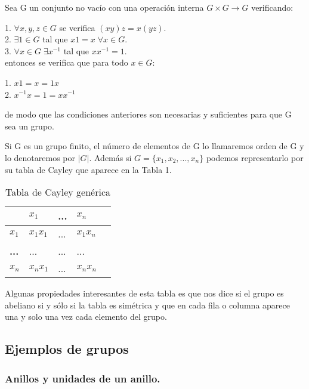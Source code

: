 \begin{proposition}
Sea G un conjunto no vacío con una operación interna $G \times G \rightarrow G$ verificando:

1. $\forall x,y,z \in G$ se verifica $(xy)z = x(yz)$. \\
2. $\exists 1 \in G$ tal que $x1 = x \; \forall x \in G$. \\
3. $\forall x \in G \; \exists x^{-1}$ tal que $xx^{-1} = 1$. \\

entonces se verifica que para todo $x \in G$:

1. $x1 = x = 1x$ \\
2. $x^{-1}x = 1 = xx^{-1}$

de modo que las condiciones anteriores son necesarias y suficientes para que G sea un grupo.
\end{proposition}

\begin{definition}
Si G es un grupo finito, el número de elementos de G lo llamaremos orden de G y lo denotaremos por $|G|$. Además si $G = \{x_1,x_2,...,x_n\}$ podemos representarlo por su tabla de Cayley que aparece en la Tabla 1.

\begin{table}
\centering
\caption{Tabla de Cayley genérica}
\begin{tabular}{l|llll}
 & \textbf{$x_1$} & \textbf{...} & \textbf{$x_n$} \\
\hline
\textbf{$x_1$} & $x_1 x_1$ & ... & $x_1 x_n$\\
\textbf{...} & ... & ... & ... \\
\textbf{$x_n$} & $x_n x_1$ & ... & $x_n x_n$\\
\end{tabular}
\end{table}
\end{definition}

Algunas propiedades interesantes de esta tabla es que nos dice si el grupo es abeliano si y sólo si la tabla es simétrica y que en cada fila o columna aparece una y solo una vez cada elemento del grupo.

\subsection{Ejemplos de grupos}

\subsubsection{Anillos y unidades de un anillo.}

